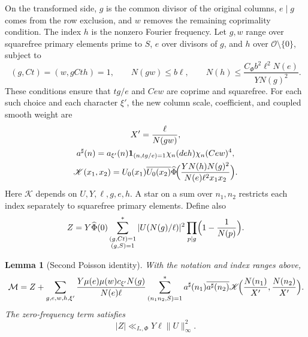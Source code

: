 \documentclass[11pt,a4paper]{article}
\numberwithin{equation}{section}
\numberwithin{figure}{section}
\newtheorem{lemma}[theorem]{Lemma}
\theoremstyle{definition}
\theoremstyle{remark}
\newcommand{\OO}{\mathcal O}
\newcommand{\ind}{\mathbf1}
\begin{document}
On the transformed side, $g$ is the common divisor of the original
columns, $e\mid g$ comes from the row exclusion, and $w$ removes the
remaining coprimality condition. The index $h$ is the nonzero Fourier
frequency. Let $g,w$ range over squarefree primary elements prime to $S$,
$e$ over divisors of $g$, and $h$ over $\OO\setminus\{0\}$, subject to
\[
 (g,Ct)=(w,gCth)=1,\qquad
 N(gw)\le b\ell,\qquad
 N(h)\le\frac{C_\Phi b^2\ell^2N(e)}{YN(g)^2}.
\]
These conditions ensure that $tg/e$ and $Cew$ are coprime and squarefree.
For each such choice and each character $\xi'$, the new column scale,
coefficient, and coupled smooth weight are
\begin{equation}\label{eq:common-poisson-output}
 \begin{gathered}
 X'=\frac{\ell}{N(gw)},\\
 a^\sharp(n)=a_{\xi'}(n)\ind_{(n,tg/e)=1}
                   \chi_n(deh)\chi_n(Cew)^4,\\
 \mathscr K(x_1,x_2)=U_0(x_1)\overline{U_0(x_2)}
               \widehat\Phi\!\Bigl(\frac{YN(h)N(g)^2}{N(e)\ell^2x_1x_2}\Bigr).
 \end{gathered}
\end{equation}
Here $\mathscr K$ depends on $U,Y,\ell,g,e,h$. A star on a sum over
$n_1,n_2$ restricts each index separately to squarefree primary elements.
Define also
\[
 Z=Y\widehat\Phi(0)
 \sum_{\substack{(g,Ct)=1\\(g,S)=1}}^*
 |U(N(g)/\ell)|^2\prod_{p\mid g}\Bigl(1-\frac1{N(p)}\Bigr).
\]


\begin{lemma}[Second Poisson identity]\label{lem:arithmetic-poisson}
With the notation and index ranges above,
\begin{equation}\label{eq:arithmetic-poisson-identity}
 \mathcal M=Z+
 \sum_{g,e,w,h,\xi'}\frac{Y\mu(e)\mu(w)c_{\xi'}N(g)}{N(e)\ell} \sum_{(n_1n_2,S)=1}^*a^\sharp(n_1)\overline{a^\sharp(n_2)}
       \mathscr K\!\Bigl(\frac{N(n_1)}{X'},\frac{N(n_2)}{X'}\Bigr).
\end{equation}
The zero-frequency term satisfies
\[
 |Z|\ll_{I_*,\Phi}Y\ell\|U\|_\infty^2.
\]
\end{lemma}
\end{document}
